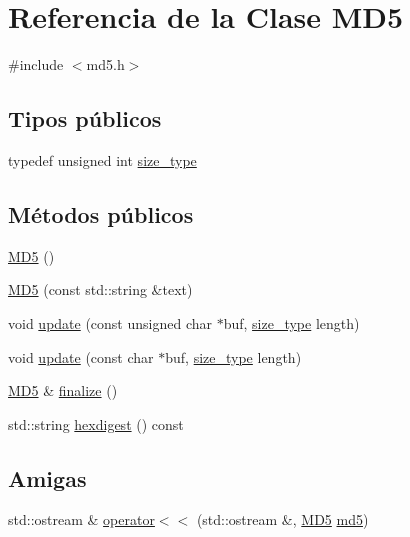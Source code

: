 \hypertarget{classMD5}{}\section{Referencia de la Clase M\+D5}
\label{classMD5}


{\ttfamily \#include $<$md5.\+h$>$}

\subsection*{Tipos públicos}
\begin{DoxyCompactItemize}
\item 
typedef unsigned int \hyperlink{classMD5_aa836972700679dbcff6ae8337f6db464}{size\+\_\+type}
\end{DoxyCompactItemize}
\subsection*{Métodos públicos}
\begin{DoxyCompactItemize}
\item 
\hyperlink{classMD5_afa6155ec36de415ab2dcf5e54b670d13}{M\+D5} ()
\item 
\hyperlink{classMD5_a155356ffd713345e69e6dcbd9f8da6ce}{M\+D5} (const std\+::string \&text)
\item 
void \hyperlink{classMD5_ac5ddf6cd8f940422396d321ea90ed045}{update} (const unsigned char $\ast$buf, \hyperlink{classMD5_aa836972700679dbcff6ae8337f6db464}{size\+\_\+type} length)
\item 
void \hyperlink{classMD5_ac5ccba375539b993958fb235f8ac849c}{update} (const char $\ast$buf, \hyperlink{classMD5_aa836972700679dbcff6ae8337f6db464}{size\+\_\+type} length)
\item 
\hyperlink{classMD5}{M\+D5} \& \hyperlink{classMD5_a10f607494a3f2e3e515fc4b99d1a06cc}{finalize} ()
\item 
std\+::string \hyperlink{classMD5_aaf466f683b4bd8b1b66544f48bf09608}{hexdigest} () const
\end{DoxyCompactItemize}
\subsection*{Amigas}
\begin{DoxyCompactItemize}
\item 
std\+::ostream \& \hyperlink{classMD5_a0739666fd0f3a7117546f6c50e0783b2}{operator$<$$<$} (std\+::ostream \&, \hyperlink{classMD5}{M\+D5} \hyperlink{md5_8h_a92c6eed2e9b51298af559aff6792770b}{md5})
\end{DoxyCompactItemize}



